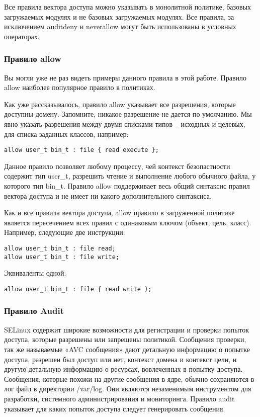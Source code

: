 \documentclass{./../class/UIR}
\begin{document}
Все правила вектора доступа можно указывать в монолитной политике, базовых
загружаемых модулях и не базовых загружаемых модулях. Все правила, за
исключением auditdeny и neverallow могут быть использованы в условных
операторах.

\subsubsection{Правило allow}

Вы могли уже не раз видеть примеры данного правила в этой работе. Правило allow
наиболее популярное правило в политиках.

Как уже рассказывалось, правило allow указывает все разрешения, которые доступны
домену. Запомните, никакое разрешение не дается по умолчанию. Мы явно указать
разрешения между двумя списками типов – исходных и целевых, для списка заданных
классов, например:

\begin{verbatim}
allow user_t bin_t : file { read execute };
\end{verbatim}

Данное правило позволяет любому процессу, чей контекст безопастности содержит
тип user\_t, разрешить чтение и выполнение любого обычного файла, у которого тип
bin\_t. Правило allow поддерживает весь общий синтаксис правил вектора доступа и
не имеет ни какого дополнительного синтаксиса.

Как и все правила вектора доступа, allow правило в загруженной политике является
пересечением всех правил с одинаковым ключом (объект, цель, класс). Например,
следующие две инструкции:

\begin{verbatim}
allow user_t bin_t : file read;
allow user_t bin_t : file write;
\end{verbatim}

Эквиваленты одной:

\begin{verbatim}
allow user_t bin_t : file { read write );
\end{verbatim}

\subsubsection{Правило Audit}

SELinux содержит широкие возможности для регистрации и проверки попыток доступа,
которые разрешены или запрещены политикой. Сообщения проверки, так же называемые
«AVC сообщения» дают детальную информацию о попытке доступа, разрешен был доступ
или нет, контекст домена и контекст цели, и другую детальную информацию о
ресурсах, вовлеченных в попытку доступа. Сообщения, которые похожи на другие
сообщения в ядре, обычно сохраняются в лог файл в директории /var/log. Они
являются незаменимым инструментом для разработки, системного администрирования и
мониторинга. Правило audit указывает для каких попыток доступа следует
генерировать сообщения.
\end{document}
